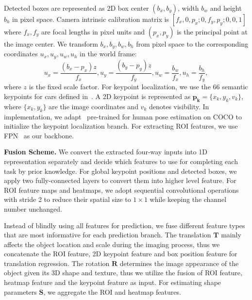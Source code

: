 \documentclass[runningheads]{llncs}
\begin{document}
Detected boxes are represented as 2D box center $(b_{x},b_{y})$, width $b_w$ and height $b_h$ in pixel space.
Camera intrinsic calibration matrix is $[f_x, 0, p_x;0, f_y, p_y; 0, 0, 1 ]$ where $f_x, f_y$ are focal lengths in pixel units and $(p_x, p_y)$ is the principal point at the image center.
We transform $b_{x},b_{y},b_w,b_h$ from pixel space to the corresponding coordinates $u_{x},u_{y},u_w,u_h$ in the world frame: \begin{equation}
u_{x}=\frac{(b_{x}-p_x)z}{f_x},u_{y}=\frac{(b_{y}-p_y)z}{f_y},u_w=\frac{b_w}{f_x},u_h=\frac{b_h}{f_y},
\end{equation}
where $z$ is the fixed scale factor. For keypoint localization, we use the 66 semantic keypoints for cars defined in~\cite{song2019apollocar3d}. A 2D keypoint is represented as $\mathbf{p_k}=\{x_k,y_k,v_k\}$, where $\{x_k,y_k\}$ are the image coordinates and $v_k$ denotes visibility. In implementation, we adapt~\cite{he2017mask} pre-trained for human pose estimation on COCO to initialize the keypoint localization branch. For extracting ROI features, we use FPN~\cite{lin2017feature} as our backbone.

\smallskip\noindent\textbf{Fusion Scheme.}
We convert the extracted four-way inputs into 1D representation separately and decide which features to use for completing each task by prior knowledge. 
For global keypoint positions and detected boxes, we apply two fully-connected layers to convert them into higher level feature. 
For ROI feature maps and heatmaps, we adopt sequential convolutional operations with stride 2 to reduce their spatial size to $1\times1$ while keeping the channel number unchanged.

Instead of blindly using all features for prediction, we fuse different feature types that are most informative for each prediction branch.
The translation $\mathbf{T}$ mainly affects the object location and scale during the imaging process, thus we concatenate the ROI feature, 2D keypoint feature and box position feature for translation regression.
The rotation $\mathbf{R}$ determines the image appearance of the object given its 3D shape and texture, thus we utilize the fusion of ROI feature, heatmap feature and the keypoint feature as input. For estimating shape parameters $\mathbf{S}$, we aggregate the ROI and heatmap features.
\end{document}
